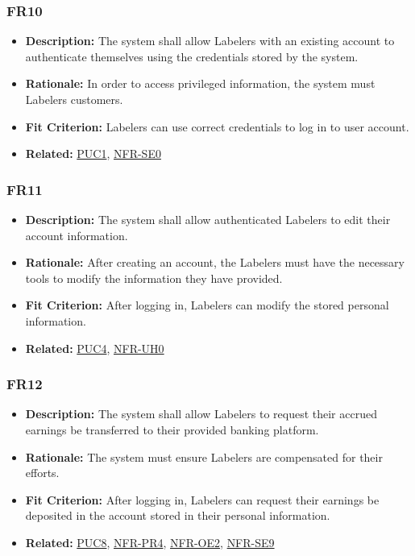 \documentclass[12pt]{article}
\begin{document}
\subsubsection*{FR10}
\label{sec:FR10}
\begin{itemize}
  \item \textbf{Description:} The system shall allow Labelers with an existing account to authenticate themselves using the credentials stored by the system.
  \item \textbf{Rationale:} In order to access privileged information, the system must Labelers customers.
\item \textbf{Fit Criterion:} Labelers can use correct credentials to log in to user account.
\item \textbf{Related:} \hyperref[sec:PUC1]{PUC1}, \hyperref[sec:SE0]{NFR-SE0}
\end{itemize}
\subsubsection*{FR11}
\label{sec:FR11}
\begin{itemize}
  \item \textbf{Description:} The system shall allow authenticated Labelers to edit their account information.
  \item \textbf{Rationale:} After creating an account, the Labelers must have the necessary tools to modify the information they have provided.
  \item \textbf{Fit Criterion:} After logging in, Labelers can modify the stored personal information.
  \item \textbf{Related:}  \hyperref[sec:PUC4]{PUC4}, \hyperref[sec:UH0]{NFR-UH0}
\end{itemize}
\subsubsection*{FR12}
\label{sec:FR12}
\begin{itemize}
  \item \textbf{Description:} The system shall allow Labelers to request their accrued earnings be transferred to their provided banking platform.
  \item \textbf{Rationale:} The system must ensure Labelers are compensated for their efforts.
\item \textbf{Fit Criterion:} After logging in, Labelers can request their earnings be deposited in the account stored in their personal information.
\item \textbf{Related:}  \hyperref[sec:PUC8]{PUC8}, \hyperref[sec:PR4]{NFR-PR4}, \hyperref[sec:OE2]{NFR-OE2}, \hyperref[sec:SE9]{NFR-SE9}
\end{itemize}
\end{document}
